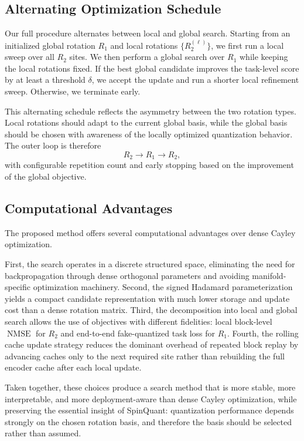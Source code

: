 \documentclass[11pt]{article}
\newcommand{\NMSE}{\operatorname{NMSE}}
\begin{document}
\subsection{Alternating Optimization Schedule}
Our full procedure alternates between local and global search. Starting from an initialized global rotation $R_1$ and local rotations $\{R_2^{(\ell)}\}$, we first run a local sweep over all $R_2$ sites. We then perform a global search over $R_1$ while keeping the local rotations fixed. If the best global candidate improves the task-level score by at least a threshold $\delta$, we accept the update and run a shorter local refinement sweep. Otherwise, we terminate early.

This alternating schedule reflects the asymmetry between the two rotation types. Local rotations should adapt to the current global basis, while the global basis should be chosen with awareness of the locally optimized quantization behavior. The outer loop is therefore
\begin{equation}
R_2 \rightarrow R_1 \rightarrow R_2,
\end{equation}
with configurable repetition count and early stopping based on the improvement of the global objective.

\subsection{Computational Advantages}
The proposed method offers several computational advantages over dense Cayley optimization.

First, the search operates in a discrete structured space, eliminating the need for backpropagation through dense orthogonal parameters and avoiding manifold-specific optimization machinery. Second, the signed Hadamard parameterization yields a compact candidate representation with much lower storage and update cost than a dense rotation matrix. Third, the decomposition into local and global search allows the use of objectives with different fidelities: local block-level $\NMSE$ for $R_2$ and end-to-end fake-quantized task loss for $R_1$. Fourth, the rolling cache update strategy reduces the dominant overhead of repeated block replay by advancing caches only to the next required site rather than rebuilding the full encoder cache after each local update.

Taken together, these choices produce a search method that is more stable, more interpretable, and more deployment-aware than dense Cayley optimization, while preserving the essential insight of SpinQuant: quantization performance depends strongly on the chosen rotation basis, and therefore the basis should be selected rather than assumed.
\end{document}
